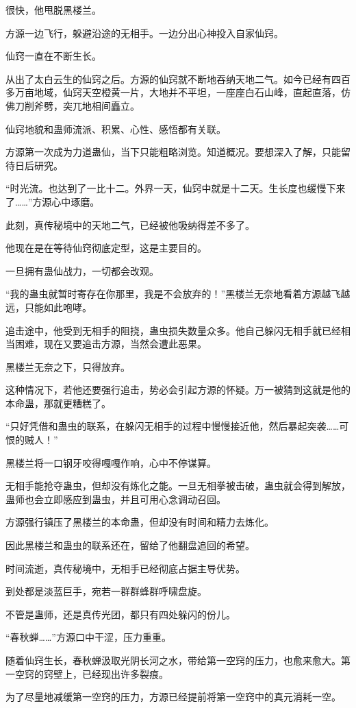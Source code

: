 \begin{this_body}
很快，他甩脱黑楼兰。

方源一边飞行，躲避沿途的无相手。一边分出心神投入自家仙窍。

仙窍一直在不断生长。

从出了太白云生的仙窍之后。方源的仙窍就不断地吞纳天地二气。如今已经有四百多万亩地域，仙窍天空橙黄一片，大地并不平坦，一座座白石山峰，直起直落，仿佛刀削斧劈，突兀地相间矗立。

仙窍地貌和蛊师流派、积累、心性、感悟都有关联。

方源第一次成为力道蛊仙，当下只能粗略浏览。知道概况。要想深入了解，只能留待日后研究。

“时光流。也达到了一比十二。外界一天，仙窍中就是十二天。生长度也缓慢下来了……”方源心中琢磨。

此刻，真传秘境中的天地二气，已经被他吸纳得差不多了。

他现在是在等待仙窍彻底定型，这是主要目的。

一旦拥有蛊仙战力，一切都会改观。

“我的蛊虫就暂时寄存在你那里，我是不会放弃的！”黑楼兰无奈地看着方源越飞越远，只能如此咆哮。

追击途中，他受到无相手的阻挠，蛊虫损失数量众多。他自己躲闪无相手就已经相当困难，现在又要追击方源，当然会遭此恶果。

黑楼兰无奈之下，只得放弃。

这种情况下，若他还要强行追击，势必会引起方源的怀疑。万一被猜到这就是他的本命蛊，那就更糟糕了。

“只好凭借和蛊虫的联系，在躲闪无相手的过程中慢慢接近他，然后暴起突袭……可恨的贼人！”

黑楼兰将一口钢牙咬得嘎嘎作响，心中不停谋算。

无相手能抢夺蛊虫，但却没有炼化之能。一旦无相拳被击破，蛊虫就会得到解放，蛊师也会立即感应到蛊虫，并且可用心念调动召回。

方源强行镇压了黑楼兰的本命蛊，但却没有时间和精力去炼化。

因此黑楼兰和蛊虫的联系还在，留给了他翻盘追回的希望。

时间流逝，真传秘境中，无相手已经彻底占据主导优势。

到处都是淡蓝巨手，宛若一群群蜂群呼啸盘旋。

不管是蛊师，还是真传光团，都只有四处躲闪的份儿。

“春秋蝉……”方源口中干涩，压力重重。

随着仙窍生长，春秋蝉汲取光阴长河之水，带给第一空窍的压力，也愈来愈大。第一空窍的窍壁上，已经现出许多裂痕。

为了尽量地减缓第一空窍的压力，方源已经提前将第一空窍中的真元消耗一空。


\end{this_body}
